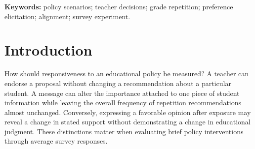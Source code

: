 
\title{}
\author{\authors}

\maketitle\draftlegend
\color{revised}
\begin{abstract}\color{added}
Brief policy messages may affect the mean level of a teacher's recommendations, the academic criteria used, or the policies the teacher endorses. A survey experiment in Spain separates assignment to three grade-repetition policy scenarios from prior preference elicitation and an additional alignment reminder. Of 3,274 assigned respondents, 2,705 provide a retained recommendation score. Policy assignment, earlier elicitation, and the reminder change mean profile-adjusted propensity by 0.62, $-1.32$, and $-1.11$ percentage points, respectively, with 95 percent intervals spanning zero. A complementary exploratory analysis finds that the reminder reduces the failed-subject slope by 4.98 points (95 percent interval $-8.47$ to $-1.50$; six-test Holm $p=0.031$), although the multiplicity-adjusted joint test of two academic slopes is less conclusive. Assignment to teacher training also raises its subsequent favorite ranking by 9.76 points, with adjusted $p=0.051$. Reestimated weighting and reconstructed-reference bootstraps leave the mean estimates small, but narrow equivalence is not uniform and missing-outcome bounds remain wide. The findings distinguish limited average responsiveness from possible changes in the application of academic criteria and stated support, without treating hypothetical scenarios as implemented educational reforms.

\end{abstract}
\noindent\textbf{Keywords:} policy scenarios; teacher decisions; grade repetition; preference elicitation; alignment; survey experiment.

\section{Introduction}
How should responsiveness to an educational policy be measured? A teacher can endorse a proposal without changing a recommendation about a particular student. A message can alter the importance attached to one piece of student information while leaving the overall frequency of repetition recommendations almost unchanged. Conversely, expressing a favorable opinion after exposure may reveal a change in stated support without demonstrating a change in educational judgment. These distinctions matter when evaluating brief policy interventions through average survey responses.

